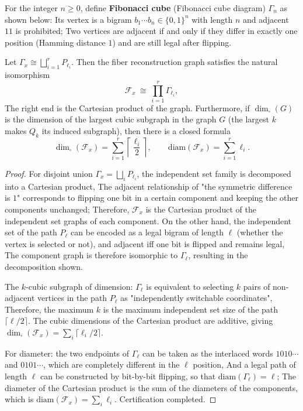 \begin{definition}\label{def:pom-fibonacci-cube}
For the integer \(n\ge 0\), define \textbf{Fibonacci cube} (Fibonacci cube diagram) \(\Gamma_n\) as shown below:
Its vertex is a bigram \(b_1\cdots b_n\in\{0,1\}^n\) with length \(n\) and adjacent \(11\) is prohibited;
Two vertices are adjacent if and only if they differ in exactly one position (Hamming distance \(1\)) and are still legal after flipping.
\end{definition}

\begin{theorem}\label{thm:pom-fiber-reconstruction-cartesian-product}
Let \(\Gamma_x\cong\bigsqcup_{i=1}^r P_{\ell_i}\).
Then the fiber reconstruction graph satisfies the natural isomorphism
\[
\mathcal F_x\ \cong\ \prod_{i=1}^r \Gamma_{\ell_i},
\]
The right end is the Cartesian product of the graph.
Furthermore, if \(\dim_{\square}(G)\) is the dimension of the largest cubic subgraph in the graph \(G\) (the largest \(k\) makes \(Q_k\) its induced subgraph), then there is a closed formula
\[
\dim_{\square}(\mathcal F_x)=\sum_{i=1}^r \left\lceil\frac{\ell_i}{2}\right\rceil,
\qquad
\mathrm{diam}(\mathcal F_x)=\sum_{i=1}^r \ell_i.
\]
\end{theorem}
\begin{proof}
For disjoint union \(\Gamma_x=\bigsqcup_i P_{\ell_i}\), the independent set family is decomposed into a Cartesian product,
The adjacent relationship of "the symmetric difference is \(1\)" corresponds to flipping one bit in a certain component and keeping the other components unchanged;
Therefore, \(\mathcal F_x\) is the Cartesian product of the independent set graphs of each component.
On the other hand, the independent set of the path \(P_{\ell}\) can be encoded as a legal bigram of length \(\ell\) (whether the vertex is selected or not), and adjacent iff one bit is flipped and remains legal,
The component graph is therefore isomorphic to \(\Gamma_{\ell}\), resulting in the decomposition shown.
\par
The \(k\)-cubic subgraph of dimension: \(\Gamma_{\ell}\) is equivalent to selecting \(k\) pairs of non-adjacent vertices in the path \(P_{\ell}\) as "independently switchable coordinates",
Therefore, the maximum \(k\) is the maximum independent set size of the path \(\lceil \ell/2\rceil\).
The cubic dimensions of the Cartesian product are additive, giving \(\dim_{\square}(\mathcal F_x)=\sum_i\lceil\ell_i/2\rceil\).
\par
For diameter: the two endpoints of \(\Gamma_{\ell}\) can be taken as the interlaced words \(1010\cdots\) and \(0101\cdots\), which are completely different in the \(\ell\) position,
And a legal path of length \(\ell\) can be constructed by bit-by-bit flipping, so that \(\mathrm{diam}(\Gamma_{\ell})=\ell\);
The diameter of the Cartesian product is the sum of the diameters of the components, which is \(\mathrm{diam}(\mathcal F_x)=\sum_i\ell_i\).
Certification completed.
\end{proof}


